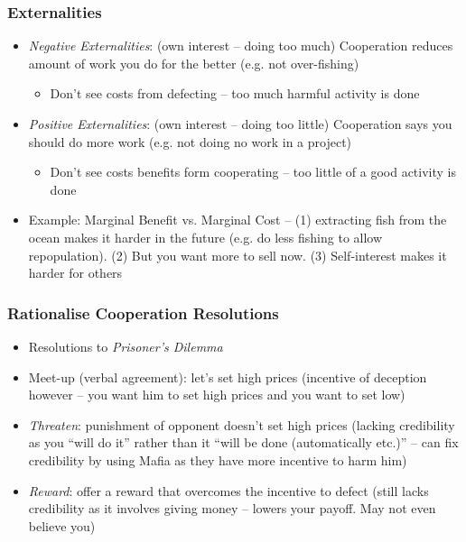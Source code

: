 \documentclass[11pt, english]{article}
\begin{document}
		\subsubsection{Externalities}

	\begin{itemize}
        \setlength\itemsep{0cm}
		\item \textit{Negative Externalities}: (own interest – doing too much) Cooperation reduces amount of work you do for the better (e.g. not over-fishing)
		\begin{itemize}
			\item Don’t see costs from defecting – too much harmful activity is done
		\end{itemize}
		\item \textit{Positive Externalities}: (own interest – doing too little) Cooperation says you should do more work (e.g. not doing no work in a project)
		\begin{itemize}
                        \item Don’t see costs benefits form cooperating – too little of a good activity is done
                \end{itemize}
		\item Example: Marginal Benefit vs. Marginal Cost – (1) extracting fish from the ocean makes it harder in the future (e.g. do less fishing to allow repopulation). (2) But you want more to sell now. (3) Self-interest makes it harder for others
	\end{itemize}

		\subsubsection{Rationalise Cooperation Resolutions}

	\begin{itemize}
        \setlength\itemsep{0cm}
		\item Resolutions to \textit{Prisoner's Dilemma}
		\item Meet-up (verbal agreement): let’s set high prices (incentive of deception however – you want him to set high prices and you want to set low)
		\item \textit{Threaten}: punishment of opponent doesn’t set high prices (lacking credibility as you ``will do it'' rather than it ``will be done (automatically etc.)'' – can fix credibility by using Mafia as they have more incentive to harm him)
		\item \textit{Reward}: offer a reward that overcomes the incentive to defect (still lacks credibility as it involves giving money – lowers your payoff. May not even believe you)
	\end{itemize}
\end{document}
